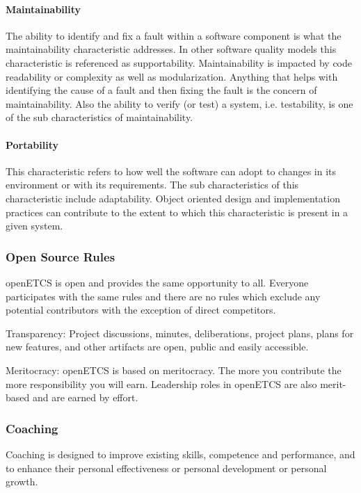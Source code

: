 \documentclass{template/openetcs_article}
\begin{document}
\paragraph{Maintainability}

The ability to identify and fix a fault within a software component is what the maintainability characteristic addresses. In other software quality models this characteristic is referenced as supportability. Maintainability is impacted by code readability or complexity as well as modularization. Anything that helps with identifying the cause of a fault and then fixing the fault is the concern of maintainability. Also the ability to verify (or test) a system, i.e. testability, is one of the sub characteristics of maintainability.



\paragraph{Portability}

This characteristic refers to how well the software can adopt to changes in its environment or with its requirements. The sub characteristics of this characteristic include adaptability. Object oriented design and implementation practices can contribute to the extent to which this characteristic is present in a given system.~



\subsubsection{Open Source Rules}

openETCS is open and provides the same opportunity to all. Everyone participates with the same rules and there are no rules which exclude any potential contributors with the exception of direct competitors. 

Transparency: Project discussions, minutes, deliberations, project plans, plans for new features, and other artifacts are open, public and easily accessible. 

Meritocracy: openETCS is based on meritocracy. The more you contribute the more responsibility you will earn. Leadership roles in openETCS are also merit-based and are earned by effort.



\subsubsection{Coaching}
Coaching is designed to improve existing skills, competence and performance, and to enhance their personal effectiveness or personal development or personal growth.
\end{document}
